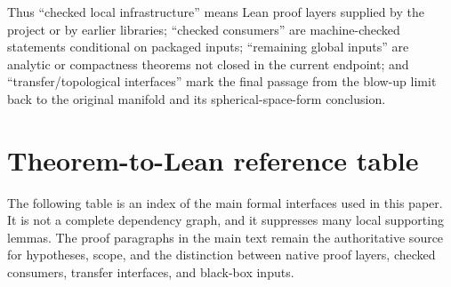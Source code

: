 \documentclass[11pt]{article}
\theoremstyle{plain}
\theoremstyle{definition}
\theoremstyle{remark}
\begin{document}
Thus ``checked local infrastructure'' means Lean proof layers supplied by the
project or by earlier libraries; ``checked consumers'' are machine-checked
statements conditional on packaged inputs; ``remaining global inputs'' are
analytic or compactness theorems not closed in the current endpoint; and
``transfer/topological interfaces'' mark the final passage from the blow-up
limit back to the original manifold and its spherical-space-form conclusion.


\section{Theorem-to-Lean reference table}

The following table is an index of the main formal interfaces used in this
paper.  It is not a complete dependency graph, and it suppresses many local
supporting lemmas.  The proof paragraphs in the main text remain the
authoritative source for hypotheses, scope, and the distinction between native
proof layers, checked consumers, transfer interfaces, and black-box inputs.
\end{document}
